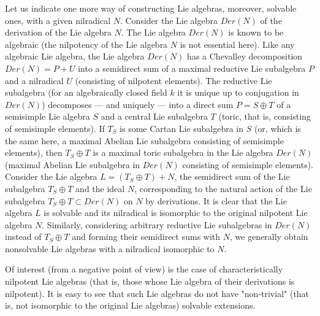 \documentclass{amsart}
\begin{document}
Let us indicate one more way of constructing Lie algebras, moreover, solvable ones, with a given nilradical $N$. Consider the Lie algebra $Der(N)$ of the derivation of the Lie algebra $N$. The Lie algebra $Der(N)$ is known to be algebraic (the nilpotency of the Lie algebra $N$ is not essential here). Like any algebraic Lie algebra, the Lie algebra $Der(N)$ has a Chevalley decomposition $Der(N)=P+U$ into a semidirect sum of a maximal reductive Lie subalgebra $P$ and a nilradical $U$ (consisting of nilpotent elements). The reductive Lie subalgebra (for an algebraically closed field $k$ it is unique up to conjugation in $Der(N)$) decomposes --- and uniquely --- into a direct sum $P=S \oplus T$ of a semisimple Lie algebra $S$ and a central Lie subalgebra $T$ (toric, that is, consisting of semisimple elements). If $T_S$ is some Cartan Lie subalgebra in $S$ (or, which is the same here, a maximal Abelian Lie subalgebra consisting of semisimple elements), then $T_S \oplus T$ is a maximal toric subalgebra in the Lie algebra $ Der(N)$ (maximal Abelian Lie subalgebra in $Der(N)$ consisting of semisimple elements). Consider the Lie algebra $L= (T_S \oplus T) + N$, the semidirect sum of the Lie subalgebra $T_S \oplus T$ and the ideal $N$, corresponding to the natural action of the Lie subalgebra $T_S \oplus T \subset Der(N) $ on $N$ by derivations. It is clear that the Lie algebra $L$ is solvable and its nilradical is isomorphic to the original nilpotent Lie algebra $N$. Similarly, considering arbitrary reductive Lie subalgebras in $Der(N)$ instead of $T_S \oplus T$ and forming their semidirect sums with $N$, we generally obtain nonsolvable Lie algebras with a nilradical isomorphic to $N$.

Of interest (from a negative point of view) is the case of characteristically nilpotent Lie algebras (that is, those whose Lie algebra of their derivations is nilpotent). It is easy to see that such Lie algebras do not have "non-trivial" (that is, not isomorphic to the original Lie algebras) solvable extensions.
\end{document}
